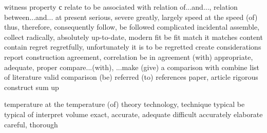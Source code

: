 \begin{multicols}{2}
	{witness}
	{property}
	{с relate to}
	{be associated with}
	{relation of...and..., relation between...and...}
	{at present}
	{serious, severe}
	{greatly, largely}
	{speed}
	{at the speed (of)}
	{thus, therefore, consequently}
	{follow, be followed}
	{complicated}
	{incidental}
	{assemble, collect}
	{radically, absolutely}
	{up-to-date, modern}
	{fit}
	{be fit}
	{match}
	{it matches}
	{content}
	{contain}
	{regret}
	{regretfully, unfortunately}
	{it is to be regretted}
	{create}
	{considerations}
	{report}
	{construction}
	{agreement, correlation}
	{be in agreement (with)}
	{appropriate, adequate, proper}
	{compare...(with), ...make (give) a comparison with}
	{combine}
	{list of literature}
	{valid}
	{comparison}
	{(be) referred (to)}
	{references}
	{paper, article}
	{rigorous}
	{construct}
	{sum up}

	{temperature}
	{at the temperature (of)}
	{theory}
	{technology, technique}
	{typical}
	{be typical of}
	{interpret}
	{volume}
	{exact, accurate, adequate}
	{difficult}
	{accurately}
	{elaborate}
	{careful, thorough}


\end{multicols}

